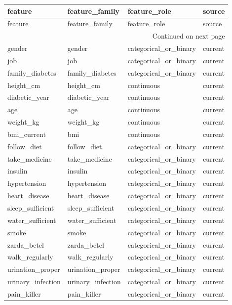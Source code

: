 \begin{longtable}{llll}
\toprule
feature & feature\_family & feature\_role & source \\
\midrule
\endfirsthead
\toprule
feature & feature\_family & feature\_role & source \\
\midrule
\endhead
\midrule
\multicolumn{4}{r}{Continued on next page} \\
\midrule
\endfoot
\bottomrule
\endlastfoot
gender & gender & categorical\_or\_binary & current \\
job & job & categorical\_or\_binary & current \\
family\_diabetes & family\_diabetes & categorical\_or\_binary & current \\
height\_cm & height\_cm & continuous & current \\
diabetic\_year & diabetic\_year & continuous & current \\
age & age & continuous & current \\
weight\_kg & weight\_kg & continuous & current \\
bmi\_current & bmi & continuous & current \\
follow\_diet & follow\_diet & categorical\_or\_binary & current \\
take\_medicine & take\_medicine & categorical\_or\_binary & current \\
insulin & insulin & categorical\_or\_binary & current \\
hypertension & hypertension & categorical\_or\_binary & current \\
heart\_disease & heart\_disease & categorical\_or\_binary & current \\
sleep\_sufficient & sleep\_sufficient & categorical\_or\_binary & current \\
water\_sufficient & water\_sufficient & categorical\_or\_binary & current \\
smoke & smoke & categorical\_or\_binary & current \\
zarda\_betel & zarda\_betel & categorical\_or\_binary & current \\
walk\_regularly & walk\_regularly & categorical\_or\_binary & current \\
urination\_proper & urination\_proper & categorical\_or\_binary & current \\
urinary\_infection & urinary\_infection & categorical\_or\_binary & current \\
pain\_killer & pain\_killer & categorical\_or\_binary & current \\

\end{longtable}
